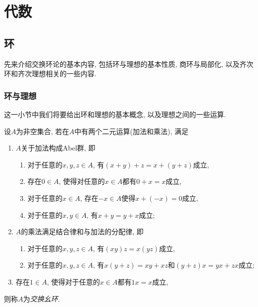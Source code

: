 
\section{代数}

\subsection{环}

先来介绍交换环论的基本内容, 包括环与理想的基本性质, 商环与局部化, 以及齐次环和齐次理想相关的一些内容.

\subsubsection{环与理想}\label{sec:algebra-ringideal}

这一小节中我们将要给出环和理想的基本概念, 以及理想之间的一些运算.

\begin{definition}
  设$A$为非空集合, 若在$A$中有两个二元运算(加法和乘法), 满足
  \begin{enumerate}
    \item $A$关于加法构成Abel群, 即
    \begin{enumerate}
      \item 对于任意的$x, y, z\in A$, 有$(x+y)+z=x+(y+z)$成立,
      \item 存在$0\in A$, 使得对任意的$x\in A$都有$0+x=x$成立,
      \item 对于任意的$x\in A$, 存在$-x\in A$使得$x+(-x)=0$成立,
      \item 对于任意的$x, y\in A$, 有$x+y=y+x$成立;
    \end{enumerate}
    \item $A$的乘法满足结合律和与加法的分配律, 即
    \begin{enumerate}
      \item 对于任意的$x, y, z\in A$, 有$(xy)z=x(yz)$成立,
      \item 对于任意的$x, y, z\in A$, 有$x(y+z)=xy+xz$和$(y+z)x=yx+zx$成立;
    \end{enumerate}
    \item 存在$1\in A$, 使得对于任意的$x\in A$都有$1x=x$成立,
  \end{enumerate}
  则称$A$为\emph{交换幺环}.
\end{definition}

